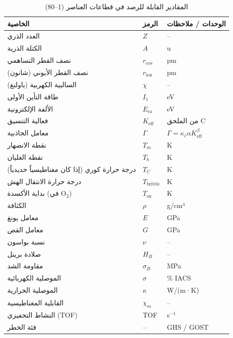 \documentclass[11pt,a4paper]{article}
\newcommand{\Keff}{K_{\mathrm{eff}}}
\newcommand{\Gcoeff}{\Gamma}
\begin{document}
\begin{otherlanguage}{arabic}
		\begin{longtable}{p{4cm} p{3cm} p{8cm}}
			\caption{المقادير القابلة للرصد في قطاعات العناصر (1–80)} \\
			\toprule
			\textbf{الخاصية} & \textbf{الرمز} & \textbf{الوحدات / ملاحظات} \\
			\midrule
			العدد الذري & \(Z\) & – \\
			الكتلة الذرية & \(A\) & u \\
			نصف القطر التساهمي & \(r_{\text{cov}}\) & pm \\
			نصف القطر الأيوني (شانون) & \(r_{\text{ion}}\) & pm \\
			السالبية الكهربية (باولنغ) & \(\chi\) & – \\
			طاقة التأين الأولى & \(I_1\) & eV \\
			الألفة الإلكترونية & \(E_{\text{ea}}\) & eV \\
			فعالية التنسيق & \(\Keff\) & من الملحق C \\
			معامل الجاذبية & \(\Gcoeff\) & \(\Gcoeff = \kappa_c \alpha \Keff^{\beta}\) \\
			نقطة الانصهار & \(T_m\) & K \\
			نقطة الغليان & \(T_b\) & K \\
			درجة حرارة كوري (إذا كان مغناطيسياً حديدياً) & \(T_C\) & K \\
			درجة حرارة الانتقال الهش & \(T_{\text{brittle}}\) & K \\
			بداية الأكسدة (في O\(_{2}\)) & \(T_{\text{ox}}\) & K \\
			الكثافة & \(\rho\) & g/cm³ \\
			معامل يونغ & \(E\) & GPa \\
			معامل القص & \(G\) & GPa \\
			نسبة بواسون & \(\nu\) & – \\
			صلادة برينل & \(H_B\) & – \\
			مقاومة الشد & \(\sigma_B\) & MPa \\
			الموصلية الكهربائية & \(\sigma\) & \% IACS \\
			الموصلية الحرارية & \(\kappa\) & W/(m·K) \\
			القابلية المغناطيسية & \(\chi_m\) & – \\
			النشاط التحفيزي (TOF) & TOF & s\(^{-1}\) \\
			فئة الخطر & – & GHS / GOST \\
			\bottomrule
		\end{longtable}
		
	\end{otherlanguage}
	
\end{document}
